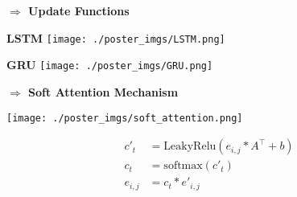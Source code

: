 \documentclass[a0paper,portrait]{baposter}
\begin{document}
\begin{poster}
{\textbf{$\Rightarrow$ Update Functions}

\begin{center}
\begin{center}
\textbf{LSTM}
\texttt{[image: ./poster\_imgs/LSTM.png]}
\end{center}
\endminipage\hfill
{}
\begin{center}
\textbf{GRU}
\texttt{[image: ./poster\_imgs/GRU.png]}
\end{center}
\endminipage\hfill
\end{center}


\textbf{$\Rightarrow$ Soft Attention Mechanism}

\begin{center}
\texttt{[image: ./poster\_imgs/soft\_attention.png]}
\end{center}
\endminipage\hfill
{}\begin{center}
\begin{align*}
    c'_t &= \text{LeakyRelu}(e_{i,j}*A^\intercal + b) \\
    c_t &= \text{softmax}(c'_t)\\
    e_{i,j} &= c_t * e'_{i,j} \\
\end{align*}
\end{center}\endminipage\hfill


}



\end{poster}
\end{document}
